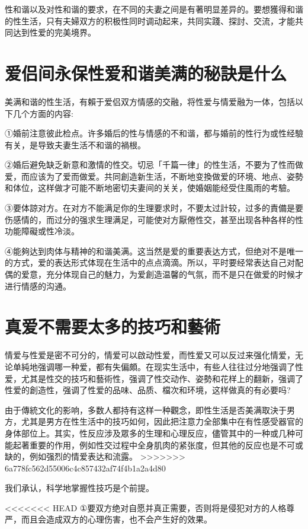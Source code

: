 \documentclass[12pt,UTF8]{ctexbook}
\begin{document}
性和谐以及对性和谐的要求，在不同的夫妻之间是有著明显差异的。要想獲得和谐的性生活，只有夫婦双方的积极性同时调动起来，共同实踐、探討、交流，才能共同达到性爱的完美境界。

\section{爱侣间永保性爱和谐美满的秘訣是什么}

美满和谐的性生活，有賴于爱侣双方情感的交融，将性爱与情爱融为一体，包括以下几个方面的内容:

①婚前注意彼此检点。许多婚后的性与情感的不和谐，都与婚前的性行为或性经驗有关，是导致夫妻生活不和谐的禍根。

②婚后避免缺乏新意和激情的性交。切忌「千篇一律」的性生活，不要为了性而做爱，而应该为了爱而做爱。共同創造新生活，不断地变換做爱的环境、地点、姿勢和体位，这样做才可能不断地密切夫妻间的关关，使婚姻能经受住風雨的考驗。

③要体諒对方。在对方不能满足你的生理要求时，不要太过計较，过多的責備是要伤感情的，而过分的强求生理满足，可能使对方厭倦性交，甚至出现各种各样的性功能障礙或性冷淡。

④能夠达到肉体与精神的和谐美满。这当然是爱的重要表达方式，但绝对不是唯一的方式，爱的表达形式体现在生活中的点点滴滴。所以，平时要经常表达自己对配偶的爱意，充分体现自己的魅力，为爱創造温馨的气氛，而不是只在做爱的时候才进行情感的沟通。

\section{真爱不需要太多的技巧和藝術}

情爱与性爱是密不可分的，情爱可以啟动性爱，而性爱又可以反过来强化情爱，无论单純地强调哪一种爱，都有失偏頗。在现实生活中，有些人往往过分地强调了性爱，尤其是性交的技巧和藝術性，强调了性交动作、姿勢和花样上的翻新，强调了性爱的創造性，强调了性爱的品味、品质、檔次和环境，这样做真的有必要吗?

由于傳統文化的影响，多数人都持有这样一种觀念，即性生活是否美满取決于男方，尤其是男方在性生活中的技巧如何，因此把注意力全部集中在有性感受器官的身体部位上。其实，性反应涉及眾多的生理和心理反应，儘管其中的一种或几种可能起著重要的作用，例如性交过程中全身肌肉的紧张度，但其他的反应也是不可或缺的，例如强烈的情爱表达和流露。
>>>>>>> 6a778fc562d55006c4c857432af74f4b1a2a4d80

我们承认，科学地掌握性技巧是个前提。

<<<<<<< HEAD
①要双方绝对自愿并真正需要，否则将是侵犯对方的人格尊严，而且会造成双方的心理伤害，也不会产生好的效果。
\end{document}
